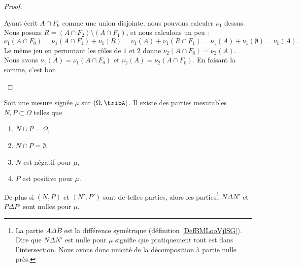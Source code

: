\begin{proof}
\begin{subproof}
Ayant écrit \( A\cap F_0\) comme une union disjointe, nous pouvons calculer \( \nu_1\) dessus. Nous posons \( R= (A\cap F_2)\setminus (A\cap F_1) \), et nous calculons un peu :
\begin{equation}
\nu_1(A\cap F_0)=\nu_1(A\cap F_1)+\nu_1(R)=\nu_1(A)+\nu_1(R\cap F_1)=\nu_1(A)+\nu_1(\emptyset)=\nu_1(A).
\end{equation}
Le même jeu en permutant les rôles de \( 1\) et \( 2\) donne \( \nu_2(A\cap F_0)=\nu_2(A)\).
\spitem[Conclusion]
Nous avons \( \nu_1(A)=\nu_1(A\cap F_0)\) et \( \nu_2(A)=\nu_2(A\cap F_0)\). En faisant la somme, c'est bon.
\end{subproof}
\end{proof}

\begin{proposition}
Soit une mesure signée \( \mu\) sur \( (\Omega,\tribA)\). Il existe des parties mesurables \( N,P\subset \Omega\) telles que
\begin{enumerate}
\item
\( N\cup P=\Omega\),
	\item
	\( N\cap P=\emptyset\),
	\item
	\( N\) est négatif pour \( \mu\),
	\item
	\( P\) est positive pour \( \mu\).
	\end{enumerate}

	De plus si \( (N,P)\) et \( (N',P')\) sont de telles parties, alors les parties\footnote{La partie \( A\Delta B\) est la différence symétrique (définition \ref{DefBMLooVjlSG}). Dire que \( N\Delta N'\) est nulle pour \( \mu\) signifie que pratiquement tout est dans l'intersection. Nous avons donc unicité de la décomposition à partie nulle près.} \( N\Delta N'\) et \( P\Delta P'\) sont nulles pour \( \mu\).
	\end{proposition}

